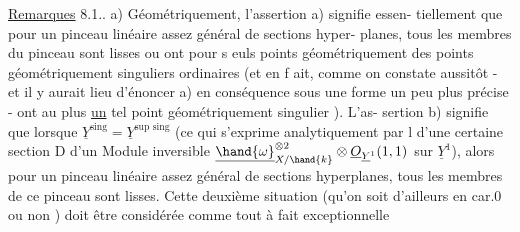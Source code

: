 \uline{Remarques} 8.1.. a) Géométriquement, l'assertion a) signifie essen-%
tiellement que pour un pinceau linéaire assez général de sections hyper-%
planes, tous les membres du pinceau sont lisses ou ont 
 pour s euls points géométriquement des points géométriquement
singuliers ordinaires (et en f ait, comme on constate aussitôt - et il
y aurait lieu d'énoncer a) en conséquence sous une forme un peu plus
précise - ont au plus \uline{un} tel point géométriquement singulier ). L'as-%
sertion b) signifie  que lorsque $\underline{Y}^{\text{sing}}=\underline{Y}^{\text{sup sing}}$ (ce qui s'exprime
analytiquement par l  d'une certaine section D d'un Module
inversible $\underline{\hand{\omega}}^{\otimes 2}_{X/\hand{k}}\otimes\underline{O}_{\underline{Y}^1}(1,1)$ sur $\underline{Y}^1$), alors pour un pinceau linéaire
assez général de sections hyperplanes, tous les membres de ce 
pinceau sont lisses. Cette deuxième situation (qu'on soit d'ailleurs
en car.0 ou non ) doit être considérée comme tout à fait exceptionnelle

